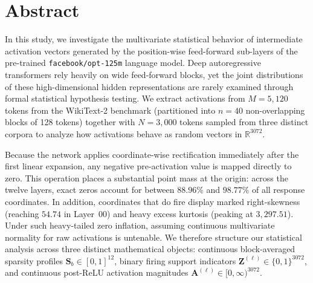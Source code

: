 \documentclass[12pt, a4paper, oneside]{report}
\theoremstyle{definition}
\newcommand{\vect}[1]{\mathbf{#1}}
\newcommand{\R}{\mathbb{R}}
\begin{document}
\setcounter{page}{2}

\chapter*{Abstract}

In this study, we investigate the multivariate statistical behavior of intermediate activation vectors generated by the position-wise feed-forward sub-layers of the pre-trained \texttt{facebook/opt-125m} language model. Deep autoregressive transformers rely heavily on wide feed-forward blocks, yet the joint distributions of these high-dimensional hidden representations are rarely examined through formal statistical hypothesis testing. We extract activations from $M = 5{,}120$ tokens from the WikiText-2 benchmark (partitioned into $n = 40$ non-overlapping blocks of 128 tokens) together with $N = 3{,}000$ tokens sampled from three distinct corpora to analyze how activations behave as random vectors in $\R^{3072}$.

Because the network applies coordinate-wise rectification immediately after the first linear expansion, any negative pre-activation value is mapped directly to zero. This operation places a substantial point mass at the origin: across the twelve layers, exact zeros account for between $88.96\%$ and $98.77\%$ of all response coordinates. In addition, coordinates that do fire display marked right-skewness (reaching $54.74$ in Layer~00) and heavy excess kurtosis (peaking at $3{,}297.51$). Under such heavy-tailed zero inflation, assuming continuous multivariate normality for raw activations is untenable. We therefore structure our statistical analysis across three distinct mathematical objects: continuous block-averaged sparsity profiles $\vect{S}_b \in [0, 1]^{12}$, binary firing support indicators $\vect{Z}^{(\ell)} \in \{0, 1\}^{3072}$, and continuous post-ReLU activation magnitudes $\vect{A}^{(\ell)} \in [0, \infty)^{3072}$.
\end{document}
